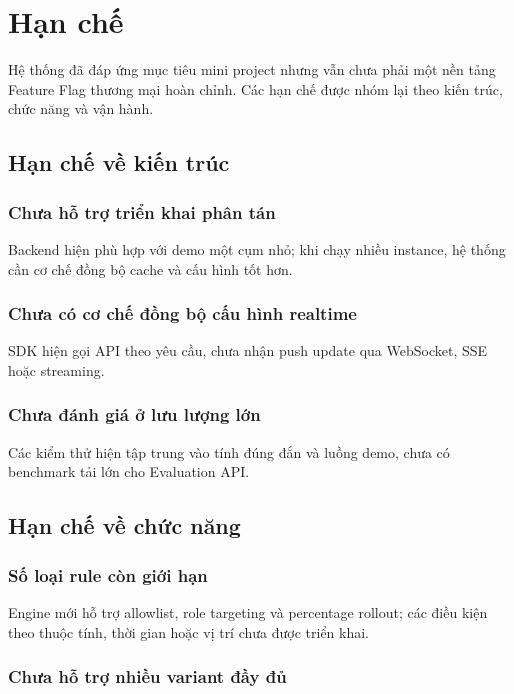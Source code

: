 \section{Hạn chế}

Hệ thống đã đáp ứng mục tiêu mini project nhưng vẫn chưa phải một nền tảng Feature Flag thương mại hoàn chỉnh. Các hạn chế được nhóm lại theo kiến trúc, chức năng và vận hành.

\subsection{Hạn chế về kiến trúc}

\subsubsection{Chưa hỗ trợ triển khai phân tán}

Backend hiện phù hợp với demo một cụm nhỏ; khi chạy nhiều instance, hệ thống cần cơ chế đồng bộ cache và cấu hình tốt hơn.

\subsubsection{Chưa có cơ chế đồng bộ cấu hình realtime}

SDK hiện gọi API theo yêu cầu, chưa nhận push update qua WebSocket, SSE hoặc streaming.

\subsubsection{Chưa đánh giá ở lưu lượng lớn}

Các kiểm thử hiện tập trung vào tính đúng đắn và luồng demo, chưa có benchmark tải lớn cho Evaluation API.

\subsection{Hạn chế về chức năng}

\subsubsection{Số loại rule còn giới hạn}

Engine mới hỗ trợ allowlist, role targeting và percentage rollout; các điều kiện theo thuộc tính, thời gian hoặc vị trí chưa được triển khai.

\subsubsection{Chưa hỗ trợ nhiều variant đầy đủ}


